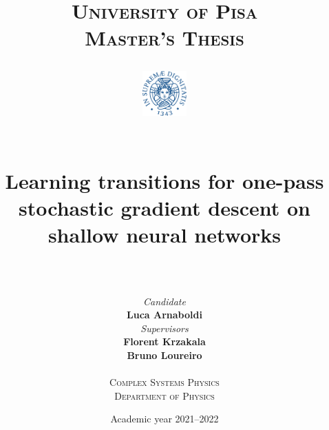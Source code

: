 \title{
  \textsc{University of Pisa}\\
  \textsc{Master's Thesis}\\

  \begin{figure}[h]
    \centering
    \includegraphics[width=0.15\textwidth]{figures/unipi_logo.pdf}
  \end{figure}


  \hrulefill \\
  \vspace{8pt}
  \Huge \textbf{Learning transitions for one-pass stochastic gradient descent on shallow neural networks} \\
  \hrulefill \\
  \vspace{20pt}
}


\author{
  \begin{minipage}[h]{0.45\linewidth}
    \begin{flushleft}
      \textit{Candidate} \\
      \textbf{Luca Arnaboldi}
    \end{flushleft}
  \end{minipage}
  \begin{minipage}[h]{0.45\linewidth}
    \begin{flushright}
      \textit{Supervisors} \\
      \textbf{Florent Krzakala} \\
      \textbf{Bruno Loureiro}
    \end{flushright}
  \end{minipage}
  \hspace{50pt}
  \vspace{30pt} \\
  \textsc{Complex Systems Physics}\\
  \textsc{Department of Physics}
}
\date{Academic year 2021--2022}
  
